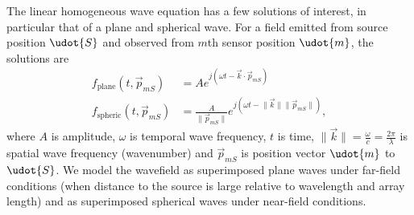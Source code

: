 {The linear homogeneous wave equation has a few solutions of interest, in particular that of a plane and spherical wave. For a field emitted from source position $\udot{S}$ and observed from $m$th sensor position $\udot{m}$, the solutions are
%
\begin{align}
f_\textrm{plane}(t,\vec{p}_{mS})  &= A e^{j(\omega t - \vec{k} \cdot \vec{p}_{mS})} \\
f_\textrm{spheric}(t,\vec{p}_{mS}) &= \frac{A}{\lVert \vec{p}_{mS} \rVert} e^{j(\omega t - \lVert\vec{k}\rVert \lVert \vec{p}_{mS} \rVert)},
\end{align}
% 
where $A$ is amplitude, $\omega$ is temporal wave frequency, $t$ is time, $\lVert\vec{k}\rVert=\frac{\omega}{c}=\frac{2\pi}{\lambda}$ is spatial wave frequency (wavenumber) and $\vec{p}_{mS}$ is position vector $\udot{m}$ to $\udot{S}$. We model the wavefield as superimposed plane waves under far-field conditions (when distance to the source is large relative to wavelength and array length) and as superimposed spherical waves under near-field conditions. 

% 
% 
% 


%

%





}
